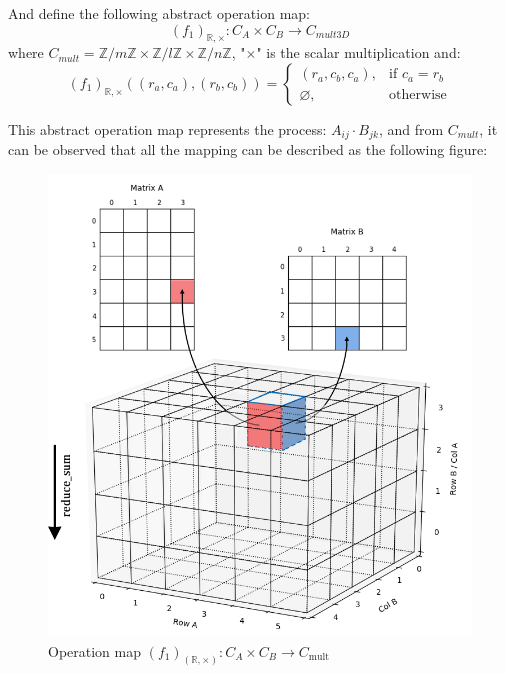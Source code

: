 \documentclass{amsart}
\theoremstyle{definition}
\theoremstyle{remark}
\numberwithin{equation}{section}
\begin{document}
And define the following abstract operation map:
\begin{equation}
(f_1)_{\mathbb{R},\times}:C_A\times C_B\to C_{mult3D}
\end{equation}
where $C_{mult}=\mathbb{Z}/{m\mathbb{Z}}\times \mathbb{Z}/{l\mathbb{Z}}\times \mathbb{Z}/{n\mathbb{Z}}$, "$\times$" is the scalar multiplication and:
\begin{equation}
(f_1)_{\mathbb{R},\times}((r_a,c_a),(r_b,c_b))=
\left\{
\begin{array}{ll}  
             (r_a,c_b,c_a), &\text{if } c_a=r_b  \\ 
             \varnothing, &\text{otherwise}
\end{array}
\right.
\end{equation}
\par
	This abstract operation map represents the process: $A_{ij}\cdot B_{jk}$, and from $C_{mult}$, it can be observed that all the mapping can be described as the following figure:
\begin{figure}[h]
	\includegraphics[scale=0.45]{Figures/Matrix3d.png}
	\caption{Operation map $(f_1)_(\mathbb{R},\times ):C_A\times C_B\to C_{\text{mult}}$}
	\label{Fig:1}
\end{figure}
\end{document}
